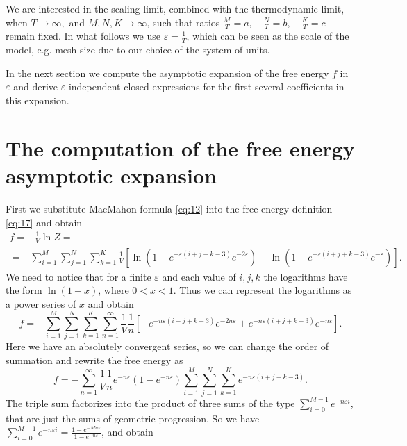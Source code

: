 \documentclass{article}
\begin{document}
We are interested in the scaling limit, combined with the thermodynamic limit, when $ T\to \infty,$
and $M,N,K\to \infty$, such that ratios $\frac{M}{T}=a,\quad \frac{N}{T}=b, \quad \frac{K}{T}=c$
remain fixed. In what follows we use $\varepsilon=\frac{1}{T}$, which can be seen as the scale of
the model, e.g. mesh size due to our choice of the system of units.

In the next section we compute the asymptotic expansion of the free energy $f$ in $\varepsilon$ and
derive $\varepsilon$-independent closed expressions for the first several coefficients in this
expansion.
  
\section{The computation of the free energy asymptotic expansion}
\label{sec:free-energy-scaling}
First we substitute MacMahon formula \eqref{eq:12} into the free energy definition \eqref{eq:17} and
obtain
\begin{multline}
  \label{eq:20}
    f=-\frac{1}{V}\ln Z =\\=- \sum_{i=1}^{M} \sum_{j=1}^{N} \sum_{k=1}^{K} \frac{1}{V}\left[
  \ln\left(1-e^{-\varepsilon (i+j+k-3)} e^{-2\varepsilon}\right) -\ln\left(1-e^{-\varepsilon
      (i+j+k-3)} e^{-\varepsilon}\right)\right].
\end{multline}
We need to notice that for a finite $\varepsilon$ and each value of $i,j,k$ the logarithms have the
form $\ln(1-x)$, where $0<x<1$. Thus we can represent the logarithms as a power series of $x$ and
obtain
\begin{equation}
  \label{eq:7}
  f=-\sum_{i=1}^{M} \sum_{j=1}^{N} \sum_{k=1}^{K}\sum_{n=1}^{\infty}
  \frac{1}{V}\frac{1}{n}\left[-e^{-n\varepsilon (i+j+k-3)} e^{-2n\varepsilon}+e^{-n\varepsilon
      (i+j+k-3)} e^{-n\varepsilon}\right]. 
\end{equation}
Here we have an absolutely convergent series, so we can change the order of summation and rewrite
the free energy as
\begin{equation}
  \label{eq:37}
  f=-\sum_{n=1}^{\infty}
  \frac{1}{V}\frac{1}{n}e^{-n\varepsilon}\left(1-e^{-n\varepsilon}\right)\sum_{i=1}^{M}
  \sum_{j=1}^{N} \sum_{k=1}^{K}e^{-n\varepsilon (i+j+k-3)} .
\end{equation}
The triple sum factorizes into the product of three sums of the type $\sum_{i=0}^{M-1}e^{-n\varepsilon
  i}$, that are just the
 sums of geometric progression. So we have $\sum_{i=0}^{M-1}e^{-n\varepsilon
  i}=\frac{1-e^{-Mn\varepsilon}}{1-e^{-n\varepsilon}}$, and obtain
\end{document}
